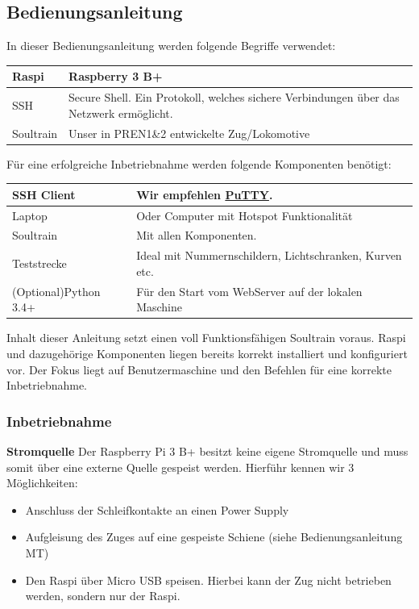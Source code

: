 \documentclass[../../main.tex]{subfiles}
\begin{document}
\subsection{Bedienungsanleitung}
In dieser Bedienungsanleitung werden folgende Begriffe verwendet:
\begin{table}[H]
    \begin{tabular}{ll}
    \hline
    Raspi & Raspberry 3 B+ \\ \hline
    SSH & Secure Shell. Ein Protokoll, welches sichere Verbindungen über das Netzwerk ermöglicht.\\ \hline
    Soultrain & Unser in PREN1\&2 entwickelte Zug/Lokomotive       \\ \hline
    \end{tabular}
\end{table}

Für eine erfolgreiche Inbetriebnahme werden folgende Komponenten benötigt:
\begin{table}[H]
    \begin{tabular}{ll}
    \hline
    SSH Client & Wir empfehlen \hyperref[https://www.putty.org/]{PuTTY}.\\ \hline
    Laptop & Oder Computer mit Hotspot Funktionalität\\ \hline
    Soultrain & Mit allen Komponenten.\\ \hline
    Teststrecke & Ideal mit Nummernschildern, Lichtschranken, Kurven etc.\\ \hline
    (Optional)Python 3.4+ & Für den Start vom WebServer auf der lokalen Maschine \\ \hline
    \end{tabular}
\end{table}

Inhalt dieser Anleitung setzt einen voll Funktionsfähigen Soultrain voraus. Raspi und dazugehörige Komponenten liegen bereits korrekt installiert und konfiguriert vor. Der Fokus liegt auf Benutzermaschine und den Befehlen für eine korrekte Inbetriebnahme.

\subsubsection{Inbetriebnahme}
\textbf{Stromquelle}
Der Raspberry Pi 3 B+ besitzt keine eigene Stromquelle und muss somit über eine externe Quelle gespeist werden. Hierführ kennen wir 3 Möglichkeiten:
\begin{itemize}
    \item Anschluss der Schleifkontakte an einen Power Supply
    \item Aufgleisung des Zuges auf eine gespeiste Schiene (siehe Bedienungsanleitung MT)
    \item Den Raspi über Micro USB speisen. Hierbei kann der Zug nicht betrieben werden, sondern nur der Raspi.
\end{itemize}
\end{document}
